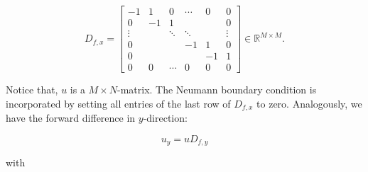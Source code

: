 \documentclass{paper}
\begin{document}
\begin{equation}
D_{f,x}=
\begin{bmatrix}
  -1 & 1 & 0 & \cdots &0 &0 \\
  0 & -1 & 1 &  & & 0\\
  \vdots  &  & \ddots & \ddots & &\vdots\\
   0 &  &  & -1 &1 &0 \\
   0 &  &  &  &-1 &1 \\
  0 & 0 & \cdots & 0 &0 &0
\end{bmatrix}\in\mathbb{R}^{M\times M}.
\label{eq:Dfx}
\end{equation}

Notice that, \begin{math}u\end{math} is a \begin{math}M\times N\end{math}-matrix. The Neumann boundary condition is incorporated by setting all entries of the last row of \begin{math}D_{f,x}\end{math} to zero. Analogously, we have the forward difference in $y$-direction:

\begin{equation}
u_{y}=uD_{f,y}
\label{eq:differenceY}
\end{equation}

with

\end{document}

